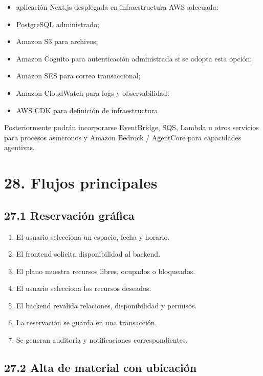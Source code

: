 \documentclass[12pt]{article}
\begin{document}
\begin{itemize}[leftmargin=1.2cm]
    \item aplicación Next.js desplegada en infraestructura AWS adecuada;
    \item PostgreSQL administrado;
    \item Amazon S3 para archivos;
    \item Amazon Cognito para autenticación administrada si se adopta esta opción;
    \item Amazon SES para correo transaccional;
    \item Amazon CloudWatch para logs y observabilidad;
    \item AWS CDK para definición de infraestructura.
\end{itemize}

Posteriormente podrán incorporarse EventBridge, SQS, Lambda u otros servicios para procesos asíncronos y Amazon Bedrock / AgentCore para capacidades agentivas.

\section*{28. Flujos principales}

\subsection*{27.1 Reservación gráfica}

\begin{enumerate}[leftmargin=1.2cm]
    \item El usuario selecciona un espacio, fecha y horario.
    \item El frontend solicita disponibilidad al backend.
    \item El plano muestra recursos libres, ocupados o bloqueados.
    \item El usuario selecciona los recursos deseados.
    \item El backend revalida relaciones, disponibilidad y permisos.
    \item La reservación se guarda en una transacción.
    \item Se generan auditoría y notificaciones correspondientes.
\end{enumerate}

\subsection*{27.2 Alta de material con ubicación}
\end{document}
